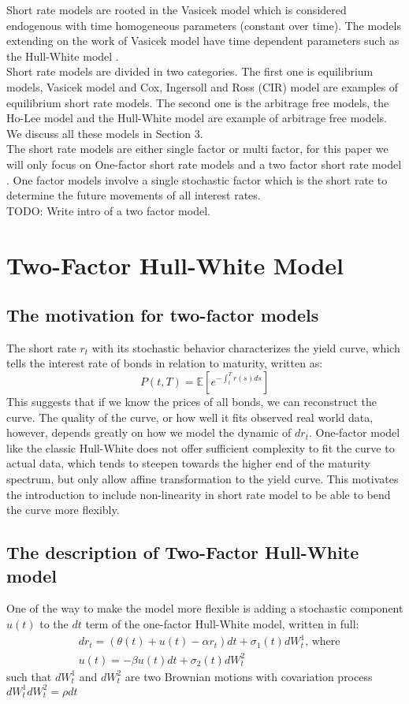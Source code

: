 \documentclass{article}
\begin{document}
Short rate models are rooted in the Vasicek model \cite{BN1} which is considered endogenous with time homogeneous parameters (constant over time).  The models extending on the work of Vasicek model have time dependent parameters such as the Hull-White model \cite{HW1}. \\

Short rate models are divided in two categories.  The first one is equilibrium models, Vasicek model and Cox, Ingersoll and Ross (CIR) model are examples of equilibrium short rate models.  The second one is the arbitrage free models, the Ho-Lee model and the Hull-White model are example of arbitrage free models.  We discuss all these models in Section 3. \\ 

The short rate models are either single factor or multi factor, for this paper we will only focus on One-factor short rate models and a two factor short rate model \cite{BA1}.  One factor  models involve a single stochastic factor which is the short rate to determine the future movements of all interest rates.  \\

TODO: Write intro of a two factor model.


\section{Two-Factor Hull-White Model 
}
\subsection{The motivation for two-factor models
}
The short rate $r_t$ with its stochastic behavior characterizes the yield curve, which tells the interest rate of bonds in relation to maturity, written as:
\[
P(t,T) = \mathbb{E}\left[e^{-\int_{t}^{T}r(s)ds}\right]
\]
This suggests that if we know the prices of all bonds, we can reconstruct the curve. The quality of the curve, or how well it fits observed real world data, however, depends greatly on how we model the dynamic of $dr_t$. One-factor model like the classic Hull-White does not offer sufficient complexity to fit the curve to actual data, which tends to steepen towards the higher end of the maturity spectrum, but only allow affine transformation to the yield curve. This motivates the introduction to include non-linearity in short rate model to be able to bend the curve more flexibly.

\subsection{The description of Two-Factor Hull-White model
}
One of the way to make the model more flexible is adding a stochastic component $u(t)$ to the $dt$ term of the one-factor Hull-White model, written in full:
\begin{align*}
& dr_t = (\theta(t) + u(t) - \alpha r_t)dt + \sigma_{1}(t)dW_{t}^{1} \text{, where} \\
& u(t) = -\beta u(t)dt + \sigma_{2}(t)dW_{t}^{2}
\end{align*}
such that $dW_{t}^{1}$ and $dW_{t}^{2}$ are two Brownian motions with covariation process $dW_{t}^{1}dW_{t}^{2} = \rho dt$
\end{document}
